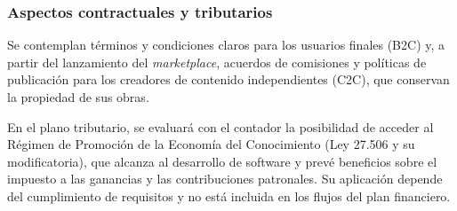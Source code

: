 \subsubsection{Aspectos contractuales y tributarios}
Se contemplan términos y condiciones claros para los usuarios finales (B2C) y, a partir del lanzamiento del \textit{marketplace}, acuerdos de comisiones y políticas de publicación para los creadores de contenido independientes (C2C), que conservan la propiedad de sus obras.

En el plano tributario, se evaluará con el contador la posibilidad de acceder al Régimen de Promoción de la Economía del Conocimiento (Ley 27.506 y su modificatoria), que alcanza al desarrollo de software y prevé beneficios sobre el impuesto a las ganancias y las contribuciones patronales. Su aplicación depende del cumplimiento de requisitos y no está incluida en los flujos del plan financiero.
